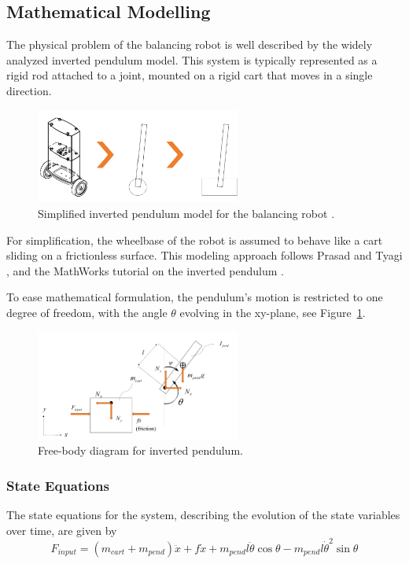 \subsection{Mathematical Modelling}
The physical problem of the balancing robot is well described by the widely analyzed inverted pendulum model. This system is typically represented as a rigid rod attached to a joint, mounted on a rigid cart that moves in a single direction.

\begin{figure}[H]
	\centering
	\includegraphics[width=0.6\textwidth]{assets/simplified-inverted-pendulem.png}
	\caption{Simplified inverted pendulum model for the balancing robot \cite{10193276}.}
	\label{fig:pendulum_model}
\end{figure}


For simplification, the wheelbase of the robot is assumed to behave like a cart sliding on a frictionless surface. This modeling approach follows Prasad and Tyagi \cite{prasad_optimal_2014}, and the MathWorks tutorial on the inverted pendulum \cite{matlab_inverted_pendulum}. 

To ease mathematical formulation, the pendulum’s motion is restricted to one degree of freedom, with the angle $\theta$ evolving in the xy-plane, see Figure~\ref{fig:pendulum_model}.

\begin{figure}[H]
	\centering
	\includegraphics[width=0.6\textwidth]{assets/FBD-inverted-pendulum.png}
	\caption{Free-body diagram for inverted pendulum\cite{10193276}.}
	\label{fig:FBD-inverted-pendulum}
\end{figure}


\subsubsection{State Equations}
The state equations for the system, describing the evolution of the state variables over time, are given by
\begin{equation}
	F_{input} = (m_{cart} + m_{pend}) \ddot{x} + f \dot{x} + m_{pend} l \ddot{\theta} \cos \theta - m_{pend} l \dot{\theta}^2 \sin \theta \label{eq:combined_force}
\end{equation}

